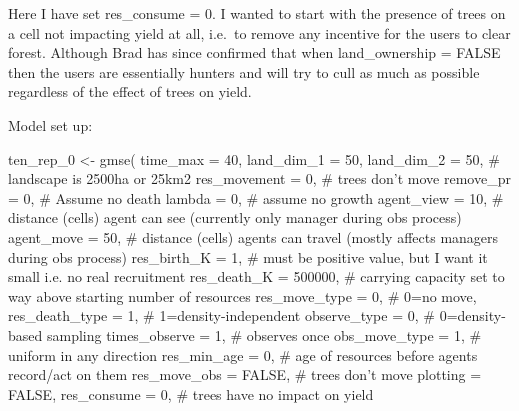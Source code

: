 \documentclass[
]{article}
\newenvironment{Shaded}{\begin{snugshade}}{\end{snugshade}}
\newcommand{\CommentTok}[1]{\textcolor[rgb]{0.50,0.62,0.50}{#1}}
\newcommand{\DataTypeTok}[1]{\textcolor[rgb]{0.87,0.87,0.75}{#1}}
\newcommand{\DecValTok}[1]{\textcolor[rgb]{0.86,0.86,0.80}{#1}}
\newcommand{\KeywordTok}[1]{\textcolor[rgb]{0.94,0.87,0.69}{#1}}
\newcommand{\NormalTok}[1]{\textcolor[rgb]{0.80,0.80,0.80}{#1}}
\newcommand{\OtherTok}[1]{\textcolor[rgb]{0.94,0.94,0.56}{#1}}
\newcommand{\StringTok}[1]{\textcolor[rgb]{0.80,0.58,0.58}{#1}}
\begin{document}
Here I have set res\_consume = 0. I wanted to start with the presence of
trees on a cell not impacting yield at all, i.e.~to remove any incentive
for the users to clear forest. Although Brad has since confirmed that
when land\_ownership = FALSE then the users are essentially hunters and
will try to cull as much as possible regardless of the effect of trees
on yield.

Model set up:

\begin{Shaded}
\begin{Highlighting}[]
\NormalTok{ten_rep_}\DecValTok{0}\NormalTok{ <-}\StringTok{ }\KeywordTok{gmse}\NormalTok{(}
  \DataTypeTok{time_max =} \DecValTok{40}\NormalTok{,}
  \DataTypeTok{land_dim_1 =} \DecValTok{50}\NormalTok{,}
  \DataTypeTok{land_dim_2 =} \DecValTok{50}\NormalTok{, }\CommentTok{# landscape is 2500ha or 25km2}
  \DataTypeTok{res_movement =} \DecValTok{0}\NormalTok{, }\CommentTok{# trees don't move }
  \DataTypeTok{remove_pr =} \DecValTok{0}\NormalTok{, }\CommentTok{# Assume no death }
  \DataTypeTok{lambda =} \DecValTok{0}\NormalTok{, }\CommentTok{# assume no growth}
  \DataTypeTok{agent_view =} \DecValTok{10}\NormalTok{, }\CommentTok{# distance (cells) agent can see (currently only manager during obs process)}
  \DataTypeTok{agent_move =} \DecValTok{50}\NormalTok{, }\CommentTok{# distance (cells) agents can travel (mostly affects managers during obs process)}
  \DataTypeTok{res_birth_K =} \DecValTok{1}\NormalTok{, }\CommentTok{# must be positive value, but I want it small i.e. no real recruitment}
  \DataTypeTok{res_death_K =} \DecValTok{500000}\NormalTok{, }\CommentTok{# carrying capacity set to way above starting number of resources}
  \DataTypeTok{res_move_type =} \DecValTok{0}\NormalTok{, }\CommentTok{# 0=no move, }
  \DataTypeTok{res_death_type =} \DecValTok{1}\NormalTok{, }\CommentTok{# 1=density-independent }
  \DataTypeTok{observe_type =} \DecValTok{0}\NormalTok{, }\CommentTok{# 0=density-based sampling }
  \DataTypeTok{times_observe =} \DecValTok{1}\NormalTok{, }\CommentTok{# observes once}
  \DataTypeTok{obs_move_type =} \DecValTok{1}\NormalTok{, }\CommentTok{# uniform in any direction}
  \DataTypeTok{res_min_age =} \DecValTok{0}\NormalTok{, }\CommentTok{# age of resources before agents record/act on them}
  \DataTypeTok{res_move_obs =} \OtherTok{FALSE}\NormalTok{, }\CommentTok{# trees don't move}
  \DataTypeTok{plotting =} \OtherTok{FALSE}\NormalTok{, }
  \DataTypeTok{res_consume =} \DecValTok{0}\NormalTok{, }\CommentTok{# trees have no impact on yield}
  

\end{Highlighting}
\end{Shaded}
\end{document}
